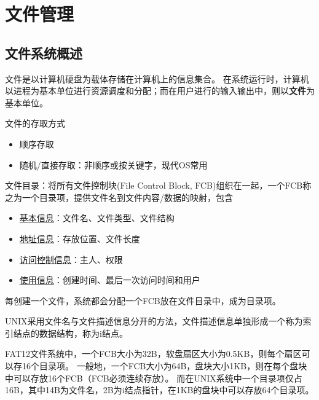 
\section{文件管理}
\subsection{文件系统概述}
文件是以计算机硬盘为载体存储在计算机上的信息集合。
在系统运行时，计算机以进程为基本单位进行资源调度和分配；而在用户进行的输入输出中，则以\textbf{文件}为基本单位。

文件的存取方式
\begin{itemize}
    \item 顺序存取
    \item 随机/直接存取：非顺序或按关键字，现代OS常用
\end{itemize}

文件目录：将所有文件控制块(File Control Block, FCB)组织在一起，一个FCB称之为一个目录项，提供文件名到文件内容/数据的映射，包含
\begin{itemize}
    \item \underline{基本信息}：文件名、文件类型、文件结构
    \item \underline{地址信息}：存放位置、文件长度
    \item \underline{访问控制信息}：主人、权限
    \item \underline{使用信息}：创建时间、最后一次访问时间和用户
\end{itemize}
每创建一个文件，系统都会分配一个FCB放在文件目录中，成为目录项。

UNIX采用文件名与文件描述信息分开的方法，文件描述信息单独形成一个称为索引结点的数据结构，称为i结点。

FAT12文件系统中，一个FCB大小为32B，软盘扇区大小为0.5KB，则每个扇区可以存16个目录项。
一般地，一个FCB大小为64B，盘块大小1KB，则在每个盘块中可以存放16个FCB（FCB必须连续存放）。
而在UNIX系统中一个目录项仅占16B，其中14B为文件名，2B为i结点指针，在1KB的盘块中可以存放64个目录项。

